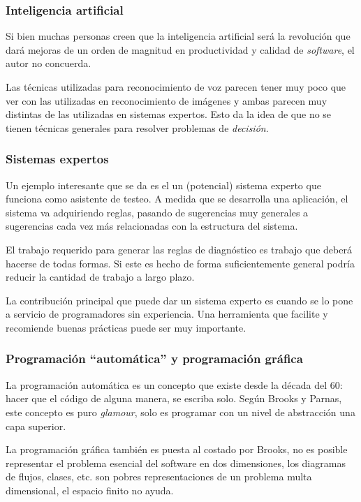 \documentclass{beamer}
\begin{document}
\begin{frame}[fragile]
  \frametitle{Inteligencia artificial}
  Si bien muchas personas creen que la inteligencia artificial ser\'a la
  revoluci\'on que dar\'a mejoras de un orden de magnitud en productividad
  y calidad de \textit{software}, el autor no concuerda.

  Las t\'ecnicas utilizadas para reconocimiento de voz parecen tener muy
  poco que ver con las utilizadas en reconocimiento de im\'agenes y ambas
  parecen muy distintas de las utilizadas en sistemas expertos.
  Esto da la idea de que no se tienen t\'ecnicas generales para resolver
  problemas de \textit{decisi\'on}.
\end{frame}


\begin{frame}[fragile]
  \frametitle{Sistemas expertos}

  Un ejemplo interesante que se da es el un (potencial) sistema experto que
  funciona como asistente de testeo.
  A medida que se desarrolla una aplicaci\'on, el sistema va adquiriendo reglas,
  pasando de sugerencias muy generales a sugerencias cada vez m\'as relacionadas
  con la estructura del sistema.

  El trabajo requerido para generar las reglas de diagn\'ostico es trabajo
  que deber\'a hacerse de todas formas. Si este es hecho de forma suficientemente
  general podr\'ia reducir la cantidad de trabajo a largo plazo.

  La contribuci\'on principal que puede dar un sistema experto es cuando se lo
  pone a servicio de programadores sin experiencia. Una herramienta que facilite
  y recomiende buenas pr\'acticas puede ser muy importante.
\end{frame}

\begin{frame}[fragile]
  \frametitle{Programaci\'on ``autom\'atica'' y programaci\'on gr\'afica}
  La programaci\'on autom\'atica es un concepto que existe desde la d\'ecada del 60:
  hacer que el c\'odigo de alguna manera, se escriba solo. Seg\'un Brooks y Parnas,
  este concepto es puro \textit{glamour}, solo es programar con un nivel de abstracci\'on
  una capa superior.

  La programaci\'on gr\'afica tambi\'en es puesta al costado por Brooks, no es posible
  representar el problema esencial del software en dos dimensiones, los diagramas
  de flujos, clases, etc. son pobres representaciones de un problema multa dimensional,
  el espacio finito no ayuda.
\end{frame}
\end{document}

